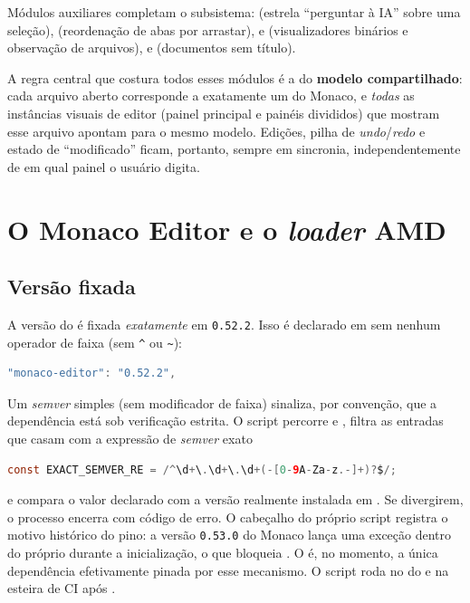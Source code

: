 \noindent
Módulos auxiliares completam o subsistema: 
(estrela \enquote{perguntar à IA} sobre uma seleção), 
(reordenação de abas por arrastar),  e
 (visualizadores binários e observação de
arquivos), e  (documentos sem título).

\begin{nota}
A regra central que costura todos esses módulos é a do \textbf{modelo
compartilhado}: cada arquivo aberto corresponde a exatamente um
 do Monaco, e \emph{todas} as instâncias visuais de editor
(painel principal e painéis divididos) que mostram esse arquivo apontam para o
mesmo modelo. Edições, pilha de \emph{undo}/\emph{redo} e estado de
\enquote{modificado} ficam, portanto, sempre em sincronia, independentemente de
em qual painel o usuário digita.
\end{nota}

\section{O Monaco Editor e o \emph{loader} AMD}
\label{sec:editor-monaco}

\subsection{Versão fixada}
\label{sec:editor-pin}

A versão do  é fixada \emph{exatamente} em \texttt{0.52.2}.
Isso é declarado em  sem nenhum operador de faixa (sem
\lstinline|^| ou \lstinline|~|):

\begin{lstlisting}[language=Java]
"monaco-editor": "0.52.2",
\end{lstlisting}

\noindent
Um \emph{semver} simples (sem modificador de faixa) sinaliza, por convenção, que
a dependência está sob verificação estrita. O script
 percorre  e
, filtra as entradas que casam com a expressão de
\emph{semver} exato

\begin{lstlisting}[language=Java]
const EXACT_SEMVER_RE = /^\d+\.\d+\.\d+(-[0-9A-Za-z.-]+)?$/;
\end{lstlisting}

\noindent
e compara o valor declarado com a versão realmente instalada em
. Se divergirem, o processo encerra com
código de erro. O cabeçalho do próprio script registra o motivo histórico do
pino: a versão \texttt{0.53.0} do Monaco lança uma exceção dentro do próprio
 durante a inicialização, o que bloqueia
. O  é, no momento, a única
dependência efetivamente pinada por esse mecanismo. O script roda no
 do  e na esteira de CI após .

